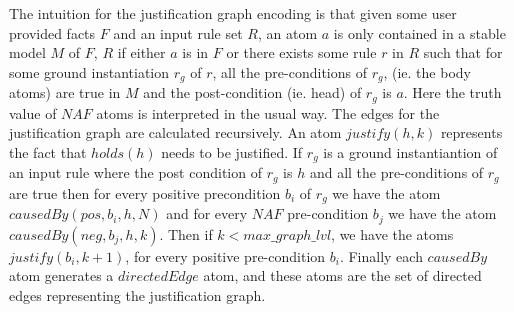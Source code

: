 The intuition for the justification graph encoding is that given some user
provided facts $F$ and an input rule set $R$, an atom $a$ is only contained in
a stable model $M$ of $F$, $R$ if either $a$ is in $F$ or there exists some
rule $r$ in $R$ such that for some ground instantiation $r_{g}$ of $r$, all
the pre-conditions of $r_{g}$, (ie. the body atoms) are true in $M$ and the
post-condition (ie. head) of $r_{g}$ is $a$. Here the truth value of $NAF$
atoms is interpreted in the usual way. The edges for the justification graph
are calculated recursively. An atom $justify(h,k)$ represents the fact that
$holds(h)$ needs to be justified. If $r_{g}$ is a ground instantiantion of an
input rule where the post condition of $r_{g}$ is $h$ and all the
pre-conditions of $r_{g}$ are true then for every positive precondition
$b_{i}$ of $r_{g}$ we have the atom $causedBy(pos,b_{i},h,N)$ and for every
$NAF$ pre-condition $b_{j}$ we have the atom $causedBy(neg,b_{j},h,k)$. Then
if $k<max\_graph\_lvl$, we have the atoms $justify(b_{i},k+1)$, for every
positive pre-condition $b_{i}$. Finally each $causedBy$ atom generates a
$directedEdge$ atom, and these atoms are the set of directed edges
representing the justification graph.


